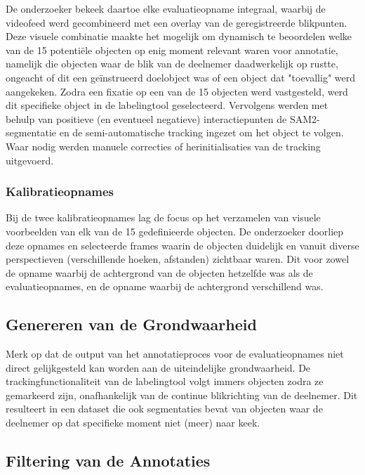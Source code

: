 De onderzoeker bekeek daartoe elke evaluatieopname integraal, waarbij de videofeed werd gecombineerd met een overlay 
van de geregistreerde blikpunten. Deze visuele combinatie maakte het mogelijk om dynamisch te beoordelen welke van de 15 potentiële 
objecten op enig moment relevant waren voor annotatie, namelijk die objecten waar de blik van de deelnemer daadwerkelijk op rustte, 
ongeacht of dit een geïnstrueerd doelobject was of een object dat "toevallig" werd aangekeken. 
Zodra een fixatie op een van de 15 objecten werd vastgesteld, werd dit specifieke object in de labelingtool geselecteerd. 
Vervolgens werden met behulp van positieve (en eventueel negatieve) interactiepunten de SAM2-segmentatie en de semi-automatische 
tracking ingezet om het object te volgen. Waar nodig werden manuele correcties of herinitialisaties van de tracking uitgevoerd.

\subsubsection{Kalibratieopnames}

Bij de twee kalibratieopnames lag de focus op het verzamelen van visuele voorbeelden van elk van de 15 gedefinieerde objecten. 
De onderzoeker doorliep deze opnames en selecteerde frames waarin de objecten duidelijk en vanuit diverse perspectieven 
(verschillende hoeken, afstanden) zichtbaar waren.
Dit voor zowel de opname waarbij de achtergrond van de objecten hetzelfde was als de evaluatieopnames, 
en de opname waarbij de achtergrond verschillend was.

\subsection{Genereren van de Grondwaarheid}

Merk op dat de output van het annotatieproces voor de evaluatieopnames niet direct gelijkgesteld kan worden aan de uiteindelijke grondwaarheid. 
De trackingfunctionaliteit van de labelingtool volgt immers objecten zodra ze gemarkeerd zijn, onafhankelijk van de continue blikrichting van de deelnemer. 
Dit resulteert in een dataset die ook segmentaties bevat van objecten waar de deelnemer op dat specifieke moment niet (meer) naar keek.

\subsection{Filtering van de Annotaties}

